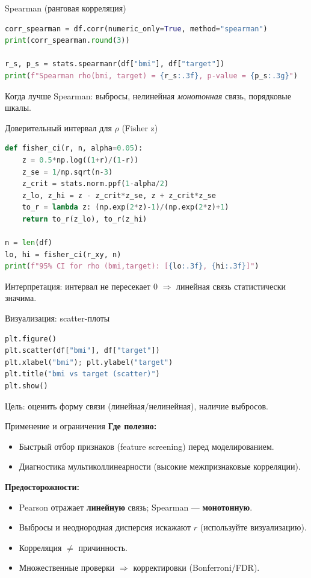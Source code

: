 \documentclass{beamer}
\begin{document}
\begin{frame}[fragile]{Spearman (ранговая корреляция)}
\begin{lstlisting}[language=Python]
corr_spearman = df.corr(numeric_only=True, method="spearman")
print(corr_spearman.round(3))

r_s, p_s = stats.spearmanr(df["bmi"], df["target"])
print(f"Spearman rho(bmi, target) = {r_s:.3f}, p-value = {p_s:.3g}")
\end{lstlisting}
Когда лучше Spearman: выбросы, нелинейная \emph{монотонная} связь, порядковые шкалы.
\end{frame}

\begin{frame}[fragile]{Доверительный интервал для $\rho$ (Fisher z)}
\begin{lstlisting}[language=Python]
def fisher_ci(r, n, alpha=0.05):
    z = 0.5*np.log((1+r)/(1-r))
    z_se = 1/np.sqrt(n-3)
    z_crit = stats.norm.ppf(1-alpha/2)
    z_lo, z_hi = z - z_crit*z_se, z + z_crit*z_se
    to_r = lambda z: (np.exp(2*z)-1)/(np.exp(2*z)+1)
    return to_r(z_lo), to_r(z_hi)

n = len(df)
lo, hi = fisher_ci(r_xy, n)
print(f"95% CI for rho (bmi,target): [{lo:.3f}, {hi:.3f}]")
\end{lstlisting}
Интерпретация: интервал не пересекает 0 $\Rightarrow$ линейная связь статистически значима.
\end{frame}

\begin{frame}[fragile]{Визуализация: scatter-плоты}
\begin{lstlisting}[language=Python]
plt.figure()
plt.scatter(df["bmi"], df["target"])
plt.xlabel("bmi"); plt.ylabel("target")
plt.title("bmi vs target (scatter)")
plt.show()
\end{lstlisting}
Цель: оценить форму связи (линейная/нелинейная), наличие выбросов.
\end{frame}

\begin{frame}{Применение и ограничения}
\textbf{Где полезно:}
\begin{itemize}
  \item Быстрый отбор признаков (feature screening) перед моделированием.
  \item Диагностика мультиколлинеарности (высокие межпризнаковые корреляции).
\end{itemize}
\textbf{Предосторожности:}
\begin{itemize}
  \item Pearson отражает \textbf{линейную} связь; Spearman — \textbf{монотонную}.
  \item Выбросы и неоднородная дисперсия искажают $r$ (используйте визуализацию).
  \item Корреляция $\neq$ причинность.
  \item Множественные проверки $\Rightarrow$ корректировки (Bonferroni/FDR).
\end{itemize}
\end{frame}
\end{document}
